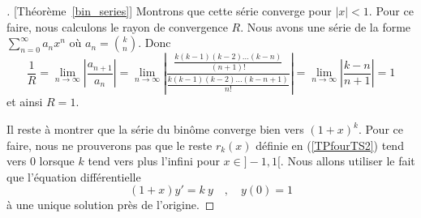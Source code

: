 {\begin{proof}[\theory][Théorème~\ref{bin_series}]
Montrons que cette série converge pour $|x|<1$.  Pour ce faire, nous
calculons le rayon de convergence $R$.  Nous avons une série de la forme
$\displaystyle \sum_{n=0}^\infty a_n x^n$ où
$\displaystyle a_n = \binom{k}{n}$.  Donc 
\[
\frac{1}{R} = \lim_{n\rightarrow \infty} \left|\frac{a_{n+1}}{a_n}\right|
= \lim_{n\rightarrow \infty} \left|
\frac{\displaystyle \frac{k(k-1)(k-2)\ldots(k-n)}{(n+1)!}}
{\displaystyle \frac{k(k-1)(k-2)\ldots(k-n+1)}{n!}} \right|
= \lim_{n\rightarrow \infty} \left| \frac{k-n}{n+1} \right| = 1
\]
et ainsi $R=1$.

Il reste à montrer que la série du binôme converge bien vers
$(1+x)^k$.  Pour ce faire, nous ne prouverons pas que le reste
$r_k(x)$ définie en (\ref{TPfourTS2}) tend vers $0$ lorsque $k$ tend
vers plus l'infini pour $x \in ]-1,1[$.  Nous allons utiliser le fait
que l'équation différentielle
\begin{equation} \label{binODE}
(1+x) y'= k\ y \quad , \quad y(0)=1
\end{equation}
à une unique solution près de l'origine.


\end{proof}}
